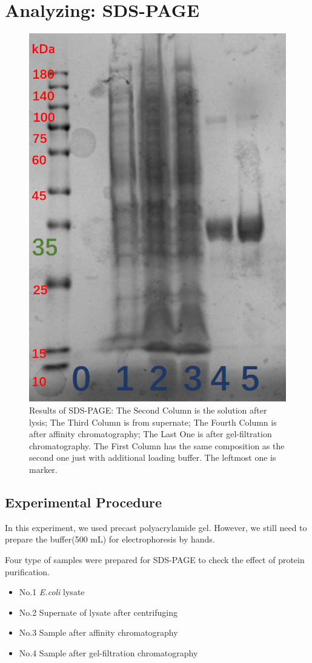 \documentclass{report}
\begin{document}
\section{Analyzing: SDS-PAGE}
\begin{figure}
    \centering
    \includegraphics[width=0.7\linewidth]{../Figures/SDS-PAGE.png}
    \caption{Results of SDS-PAGE: The Second Column is the solution after lysis; The Third Column is from supernate; The Fourth Column is after affinity chromatography; The Last One is after gel-filtration chromatography. The First Column has the same composition as the second one just with additional loading buffer. The leftmost one is marker.}
    \label{Results of SDS-PAGE}
\end{figure}
\subsection{Experimental Procedure}
In this experiment, we used precast polyacrylamide gel.
However, we still need to prepare the buffer(500 mL) for electrophoresis by hands.

Four type of samples were prepared for SDS-PAGE to check the effect of protein purification.

\begin{itemize}
    \item No.1 \textit{E.coli} lysate
    \item No.2 Supernate of lysate after centrifuging
    \item No.3 Sample after affinity chromatography
    \item No.4 Sample after gel-filtration chromatography
\end{itemize}
\end{document}
